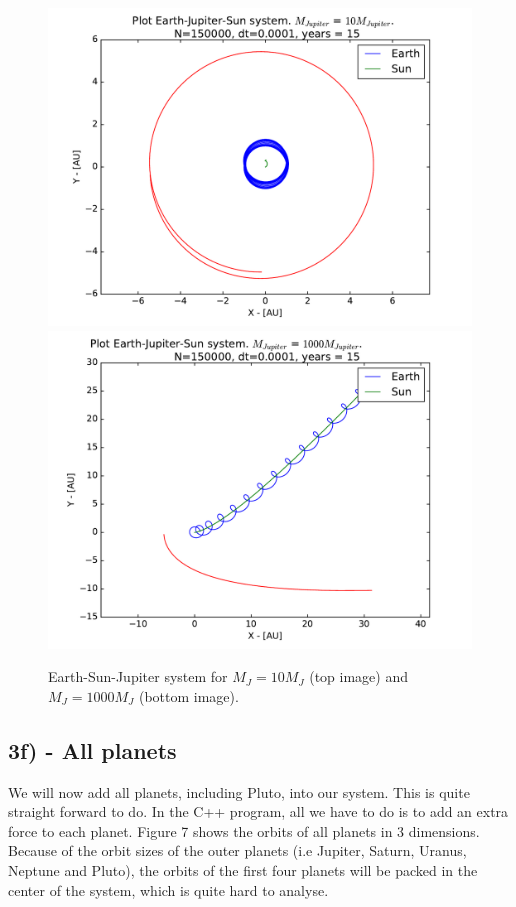 \documentclass[12pt]{article}
\begin{document}
\begin{figure}[hbtp]
\centering
\includegraphics[width=\linewidth]{Plots/Earth_Sun_Jupiter_10MJ.pdf}
\includegraphics[width=\linewidth]{Plots/Earth_Sun_Jupiter_1000MJ.pdf}
\caption{Earth-Sun-Jupiter system for $M_J = 10M_J$ (top image) and $M_J = 1000M_J$ (bottom image).}
\end{figure}

\newpage

\subsection*{3f) - All planets}
We will now add all planets, including Pluto, into our system. This is quite straight forward to do. In the C++ program, all we have to do is to add an extra force to each planet. Figure 7 shows the orbits of all planets in 3 dimensions. Because of the orbit sizes of the outer planets (i.e Jupiter, Saturn, Uranus, Neptune and Pluto), the orbits of the first four planets will be packed in the center of the system, which is quite hard to analyse. 
\end{document}
